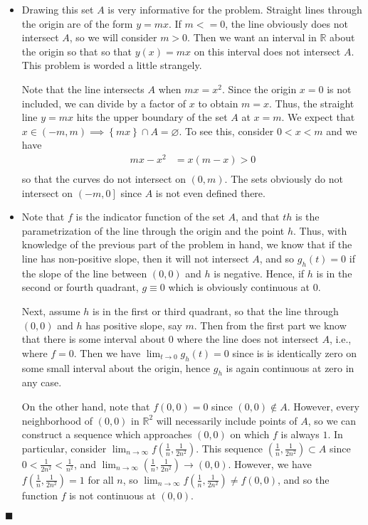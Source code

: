 \documentclass[12pt]{article}
\renewcommand{\qed}{\hfill$\blacksquare$}
\renewenvironment{proof}{\begin{addmargin}[1em]{0em}\begin{newproof}}{\end{newproof}\end{addmargin}\qed}
\begin{document}
\begin{proof}
 \begin{itemize}
 	\item Drawing this set $A$ is very informative for the problem. Straight lines through the origin are of the form $y=mx$. If $m <=0$, the line obviously does not intersect $A$, so we will consider $m > 0$. Then we want an interval in $\mathbb{R}$ about the origin so that so that $y\left(x\right) = mx$ on this interval does not intersect $A$. This problem is worded a little strangely. 
 	
 	Note that the line intersects $A$ when $ mx = x^2$. Since the origin $x=0$ is not included, we can divide by a factor of $x$ to obtain $m = x$. Thus, the straight line $y=mx$ hits the upper boundary of the set $A$ at $x=m$. We expect that $x \in \left(-m,m\right) \implies \left\{ mx\right\}\cap A = \varnothing$. To see this, consider $0 < x < m$ and we have
 	\begin{align*}
 		mx - x^2 & = x \left(m -x\right)  > 0 \\
 	\end{align*}
 	so that the curves do not intersect on $\left(0,m\right)$. The sets obviously do not intersect on $\left(-m,0\right]$ since $A$ is not even defined there.
 	
 	\item Note that $f$ is the indicator function of the set $A$, and that $th$ is the parametrization of the line through the origin and the point $h$. Thus, with knowledge of the previous part of the problem in hand, we know that if the line has non-positive slope, then it will not intersect $A$, and so $g_h\left(t\right) = 0$ if the slope of the line between $\left(0,0\right)$ and $h$ is negative. Hence, if $h$ is in the second or fourth quadrant, $g \equiv 0$ which is obviously continuous at $0$. 
 	
 	Next, assume $h$ is in the first or third quadrant, so that the line through $\left(0,0\right)$ and $h$ has positive slope, say $m$. Then from the first part we know that there is some interval about $0$ where the line does not intersect $A$, i.e., where $f=0$. Then we have $\lim_{t\rightarrow 0} g_h\left(t\right) = 0$ since is is identically zero on some small interval about the origin, hence $g_h$ is again continuous at zero in any case. 
 	
 	On the other hand, note that $f\left(0,0\right) = 0$ since $\left(0,0\right)\notin A$. However, every neighborhood of $\left(0,0\right)$ in $\mathbb{R}^2$ will necessarily include points of $A$, so we can construct a sequence which approaches $\left(0,0\right)$ on which $f$ is always $1$. In particular, consider $\lim_{n\rightarrow \infty} f\left( \frac{1}{n}, \frac{1}{2n^2} \right)$. This sequence $\left(\frac{1}{n}, \frac{1}{2n^2}\right) \subset A$ since $0 < \frac{1}{2n^2} < \frac{1}{n^2} $, and $\lim_{n\rightarrow \infty} \left(\frac{1}{n}, \frac{1}{2n^2}\right) \rightarrow \left(0,0\right)$. However, we have $f\left(\frac{1}{n}, \frac{1}{2n^2}\right) = 1$ for all $n$, so $\lim_{n\rightarrow \infty} f\left(\frac{1}{n}, \frac{1}{2n^2}\right) \neq f\left(0,0\right)$, and so the function $f$ is not continuous at $\left(0,0\right)$.
 

\end{itemize}
\end{proof}
\end{document}
